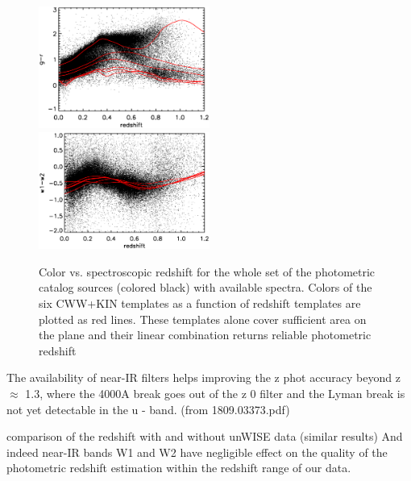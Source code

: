 \documentclass[apj,iop]{emulateapj}
\begin{document}
\begin{figure}[!ht]
	\includegraphics[width=0.5\textwidth]{figures/color_gr_z.eps}
	\includegraphics[width=0.5\textwidth]{figures/color_w1w2_z.eps}
	\caption{Color vs. spectroscopic redshift for the whole set of the photometric catalog sources (colored black) with available spectra. Colors of the six CWW+KIN templates as a function of redshift templates are plotted as red lines. These templates alone cover sufficient area on the plane and their linear combination returns reliable photometric redshift}
	\label{fig:color_z}
\end{figure}

The availability of near-IR filters helps improving the z phot accuracy beyond z $\approx$ 1.3, where the 4000A break goes out of the z 0 filter and the Lyman break is not yet detectable in the u - band. (from 1809.03373.pdf)

	comparison of the redshift with and without unWISE data (similar results)
And indeed near-IR bands W1 and W2 have negligible effect on the quality of the photometric redshift estimation within the redshift range of our data.
\end{document}
